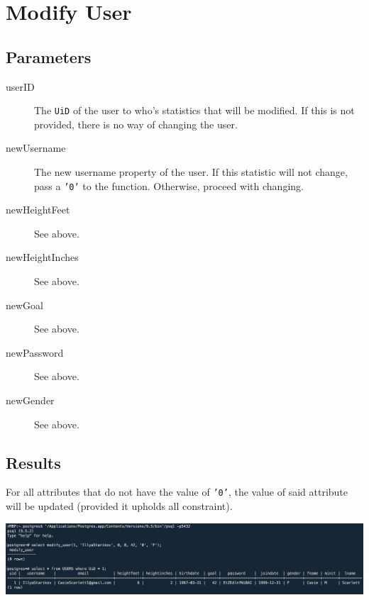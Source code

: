 \section{Modify User}

\subsection{Parameters}
\begin{description}
    \item [userID] The \texttt{UiD} of the user to who's statistics that will be modified. If this is not provided, there is no way of changing the user.
    \item [newUsername] The new username property of the user. If this statistic will not change, pass a \texttt{'0'} to the function. Otherwise, proceed with changing.
    \item [newHeightFeet] See above.
    \item [newHeightInches] See above.
    \item [newGoal] See above.
    \item [newPassword] See above.
    \item [newGender] See above.
\end{description}

\subsection{Results}
For all attributes that do not have the value of \texttt{'0'}, the value of said attribute will be updated (provided it upholds all constraint).

\begin{center}
\includegraphics[width=\columnwidth]{include/assets/screenshots/modify_user}
\end{center}